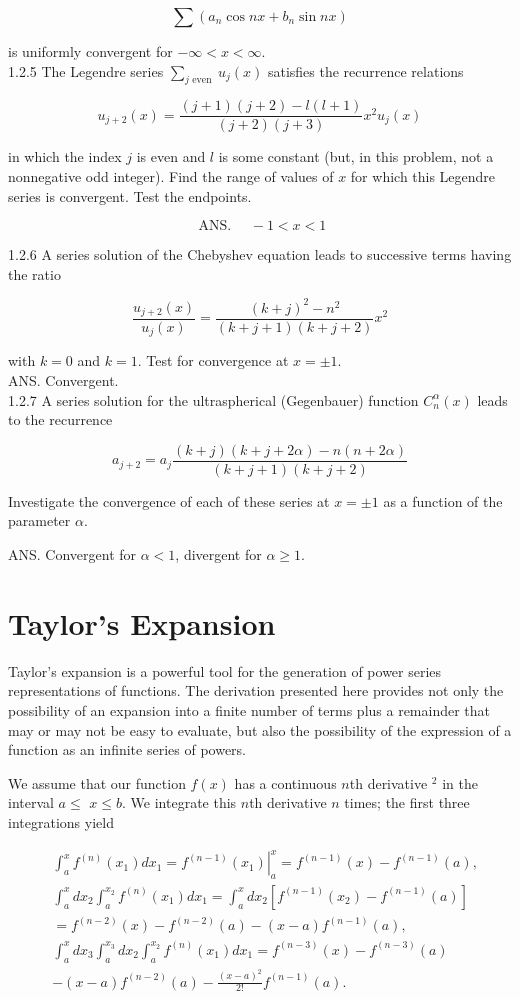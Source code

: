 \documentclass[10pt]{article}
\begin{document}
$$
\sum\left(a_{n} \cos n x+b_{n} \sin n x\right)
$$

is uniformly convergent for $-\infty<x<\infty$.\\
1.2.5 The Legendre series $\sum_{j \text { even }} u_{j}(x)$ satisfies the recurrence relations

$$
u_{j+2}(x)=\frac{(j+1)(j+2)-l(l+1)}{(j+2)(j+3)} x^{2} u_{j}(x)
$$

in which the index $j$ is even and $l$ is some constant (but, in this problem, not a nonnegative odd integer). Find the range of values of $x$ for which this Legendre series is convergent. Test the endpoints.

$$
\text { ANS. } \quad-1<x<1
$$

1.2.6 A series solution of the Chebyshev equation leads to successive terms having the ratio

$$
\frac{u_{j+2}(x)}{u_{j}(x)}=\frac{(k+j)^{2}-n^{2}}{(k+j+1)(k+j+2)} x^{2}
$$

with $k=0$ and $k=1$. Test for convergence at $x= \pm 1$.\\
ANS. Convergent.\\
1.2.7 A series solution for the ultraspherical (Gegenbauer) function $C_{n}^{\alpha}(x)$ leads to the recurrence

$$
a_{j+2}=a_{j} \frac{(k+j)(k+j+2 \alpha)-n(n+2 \alpha)}{(k+j+1)(k+j+2)}
$$

Investigate the convergence of each of these series at $x= \pm 1$ as a function of the parameter $\alpha$.

ANS. Convergent for $\alpha<1$, divergent for $\alpha \geq 1$.

\section*{Taylor's Expansion}
Taylor's expansion is a powerful tool for the generation of power series representations of functions. The derivation presented here provides not only the possibility of an expansion into a finite number of terms plus a remainder that may or may not be easy to evaluate, but also the possibility of the expression of a function as an infinite series of powers.

We assume that our function $f(x)$ has a continuous $n$th derivative ${ }^{2}$ in the interval $a \leq$ $x \leq b$. We integrate this $n$th derivative $n$ times; the first three integrations yield

$$
\begin{aligned}
& \int_{a}^{x} f^{(n)}\left(x_{1}\right) d x_{1}=\left.f^{(n-1)}\left(x_{1}\right)\right|_{a} ^{x}=f^{(n-1)}(x)-f^{(n-1)}(a), \\
& \int_{a}^{x} d x_{2} \int_{a}^{x_{2}} f^{(n)}\left(x_{1}\right) d x_{1}=\int_{a}^{x} d x_{2}\left[f^{(n-1)}\left(x_{2}\right)-f^{(n-1)}(a)\right] \\
& =f^{(n-2)}(x)-f^{(n-2)}(a)-(x-a) f^{(n-1)}(a), \\
& \int_{a}^{x} d x_{3} \int_{a}^{x_{3}} d x_{2} \int_{a}^{x_{2}} f^{(n)}\left(x_{1}\right) d x_{1}=f^{(n-3)}(x)-f^{(n-3)}(a) \\
& -(x-a) f^{(n-2)}(a)-\frac{(x-a)^{2}}{2!} f^{(n-1)}(a) .
\end{aligned}
$$
\end{document}
